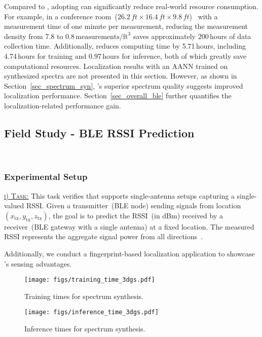 Compared to \nerft, adopting \ourSystem can significantly reduce real-world resource consumption.  
For example, in a conference room~(\(26.2\,\textit{ft} \times 16.4\,\textit{ft} \times 9.8\,\textit{ft}\))~\cite{matlab_conference_room} with a measurement time of one minute per measurement, reducing the measurement density from 7.8 to 0.8\,\(\text{measurements}/\text{ft}^3\) saves approximately 200\,hours of data collection time.  
Additionally, \ourSystem reduces computing time by 5.71\,hours, including 4.74\,hours for training and 0.97\,hours for inference, both of which greatly save computational resources.  
Localization results with an AANN trained on synthesized spectra are not presented in this section.  
However, as shown in Section~\ref{sec_spectrum_syn}, \ourSystem's superior spectrum quality suggests improved localization performance.
Section~\ref{sec_overall_ble} further quantifies the localization-related performance gain.



\subsection{Field Study - BLE RSSI Prediction}~\label{sec_overall_ble}


\subsubsection{Experimental Setup}


\underline{\textsc{i) Task:}}
This task verifies that \ourSystem supports single-antenna setups capturing a single-valued RSSI.
Given a transmitter~(BLE node) sending signals from location~$\left(x_{\text{tx}}, y_{\text{tx}}, z_{\text{tx}}\right)$, the goal is to predict the RSSI~(in dBm) received by a receiver~(BLE gateway with a single antenna) at a fixed location.  
The measured RSSI represents the aggregate signal power from all directions~\cite{zhao2023nerf}.  


Additionally, we conduct a fingerprint-based localization application to showcase \ourSystem's sensing advantages.  



\begin{figure}[t]
	\begin{minipage}[t]{0.48\linewidth} 
    	\texttt{[image: figs/training\_time\_3dgs.pdf]}
                \caption{Training times for spectrum synthesis.}
        \label{fig_time_rfid_training}
	\end{minipage}
 \hspace{0.05in}
 	\begin{minipage}[t]{0.48\linewidth} 
    	\texttt{[image: figs/inference\_time\_3dgs.pdf]}
                \caption{Inference times for spectrum synthesis.}
        \label{fig_time_rfid_inference}
	\end{minipage}
 \Description[]{}
\end{figure}



